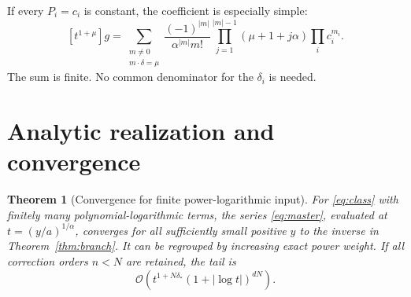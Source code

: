 \documentclass[11pt,a4paper]{article}
\numberwithin{equation}{section}
\newtheorem{theorem}{Theorem}[section]
\theoremstyle{definition}\newtheorem{definition}[theorem]{Definition}
\theoremstyle{remark}\newtheorem{remark}[theorem]{Remark}
\newcommand{\bigO}{\mathcal O}
\begin{document}
If every \(P_i=c_i\) is constant, the coefficient is especially simple:
\begin{equation}\label{eq:pure-multi}
 [t^{1+\mu}]g
 =\sum_{\substack{m\ne0\\m\cdot\delta=\mu}}
 \frac{(-1)^{|m|}}{\alpha^{|m|}m!}
 \prod_{j=1}^{|m|-1}(\mu+1+j\alpha)\prod_i c_i^{m_i}.
\end{equation}
The sum is finite. No common denominator for the \(\delta_i\) is needed.

\section{Analytic realization and convergence}
\label{sec:convergence}

\begin{theorem}[Convergence for finite power-logarithmic input]\label{thm:convergence}
For \eqref{eq:class} with finitely many polynomial-logarithmic terms, the
series \eqref{eq:master}, evaluated at \(t=(y/a)^{1/\alpha}\), converges for
all sufficiently small positive \(y\) to the inverse in
Theorem~\ref{thm:branch}. It can be regrouped by increasing exact power
weight. If all correction orders \(n<N\) are retained, the tail is
\begin{equation}\label{eq:degree-tail}
 \bigO\!\left(t^{1+N\delta_*}(1+|\log t|)^{dN}\right).
\end{equation}
\end{theorem}
\end{document}
